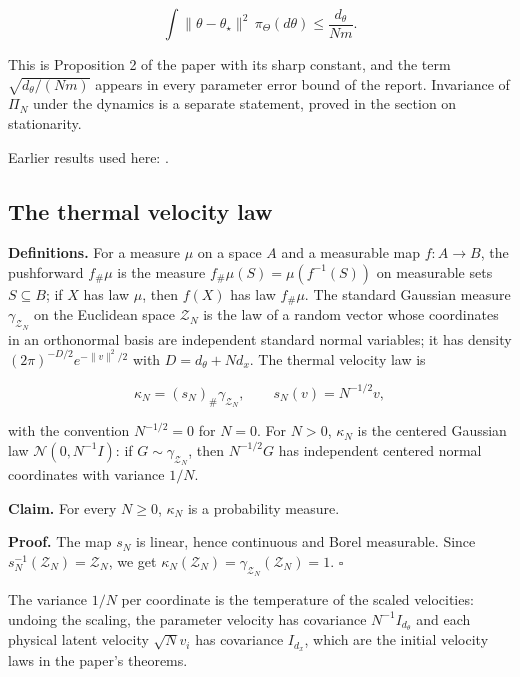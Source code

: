 \documentclass[11pt,a4paper]{report}
\begin{document}
\[\int\|\theta-\theta_\star\|^2\,\pi_\Theta(d\theta)\le\frac{d_\theta}{Nm}.\]


This is Proposition 2 of the paper with its sharp constant, and the term \(\sqrt{d_\theta/(Nm)}\) appears in every parameter error bound of the report. Invariance of \(\Pi_N\) under the dynamics is a separate statement, proved in the section on stationarity.



Earlier results used here: \cite[Section~3.6]{LangevinLean2026Proximal}.
\subsection{\texorpdfstring{The thermal velocity law}{The thermal velocity law}}
\label{report-step-KIPLMC-Target-lean-1}


\textbf{Definitions.} For a measure \(\mu\) on a space \(A\) and a measurable map \(f:A\to B\), the pushforward \(f_\#\mu\) is the measure \(f_\#\mu(S)=\mu(f^{-1}(S))\) on measurable sets \(S\subseteq B\); if \(X\) has law \(\mu\), then \(f(X)\) has law \(f_\#\mu\). The standard Gaussian measure \(\gamma_{\mathcal Z_N}\) on the Euclidean space \(\mathcal Z_N\) is the law of a random vector whose coordinates in an orthonormal basis are independent standard normal variables; it has density \((2\pi)^{-D/2}e^{-\|v\|^2/2}\) with \(D=d_\theta+Nd_x\). The thermal velocity law is


\[\kappa_N=(s_N)_\#\gamma_{\mathcal Z_N},\qquad s_N(v)=N^{-1/2}v,\]


with the convention \(N^{-1/2}=0\) for \(N=0\). For \(N>0\), \(\kappa_N\) is the centered Gaussian law \(\mathcal N(0,N^{-1}I)\): if \(G\sim\gamma_{\mathcal Z_N}\), then \(N^{-1/2}G\) has independent centered normal coordinates with variance \(1/N\).




\textbf{Claim.} For every \(N\ge0\), \(\kappa_N\) is a probability measure.




\textbf{Proof.} The map \(s_N\) is linear, hence continuous and Borel measurable. Since \(s_N^{-1}(\mathcal Z_N)=\mathcal Z_N\), we get \(\kappa_N(\mathcal Z_N)=\gamma_{\mathcal Z_N}(\mathcal Z_N)=1\). \(\square\)




The variance \(1/N\) per coordinate is the temperature of the scaled velocities: undoing the scaling, the parameter velocity has covariance \(N^{-1}I_{d_\theta}\) and each physical latent velocity \(\sqrt N v_i\) has covariance \(I_{d_x}\), which are the initial velocity laws in the paper's theorems.
\end{document}
